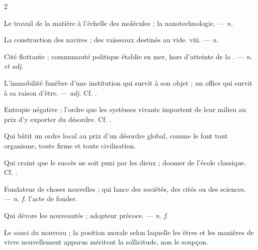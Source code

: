 \begin{multicols}{2}

 Le travail de la matière à l'échelle des molécules ; la nanotechnologie. —  \textit{n.}

 La construction des navires ;  des vaisseaux destinés au vide.   viii. —  \textit{n.}

 Cité flottante ; communauté politique établie en mer, hors d'atteinte de la . —  \textit{n. et adj.}

 L'immobilité funèbre d'une institution qui survit à son objet ; un office qui survit à sa raison d'être. —  \textit{adj.} Cf. .

 Entropie négative ; l'ordre que les systèmes vivants importent de leur milieu au prix d'y exporter du désordre. Cf. .

 Qui bâtit un ordre local au prix d'un désordre global, comme le font tout organisme, toute firme et toute civilisation.

 Qui craint que le succès ne soit puni par les dieux ; doomer de l'école classique. Cf. .

 Fondateur de choses nouvelles ; qui lance des sociétés, des cités ou des sciences.  —  \textit{n. f.} l'acte de fonder.

 Qui dévore les nouveautés ; adopteur précoce.   —  \textit{n. f.}

 Le souci du nouveau ; la position morale selon laquelle les êtres et les manières de vivre nouvellement apparus méritent la sollicitude, non le soupçon.


\end{multicols}

